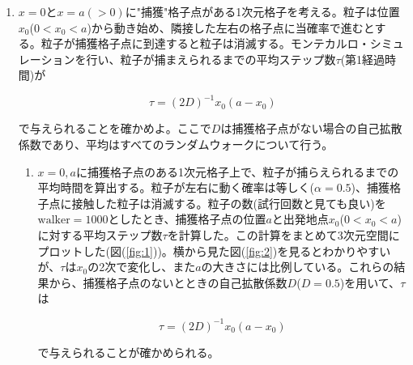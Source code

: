 \documentclass{jsarticle}
\begin{document}
        \begin{enumerate}
            \renewcommand{\labelenumi}{\alph{enumi}.}
            \renewcommand{\labelenumii}{}
            
            \item  $x=0$と$x=a(>0)$に"捕獲"格子点がある1次元格子を考える。粒子は位置$x_{0}$($0<x_{0}<a$)から動き始め、隣接した左右の格子点に当確率で進むとする。粒子が捕獲格子点に到達すると粒子は消滅する。モンテカルロ・シミュレーションを行い、粒子が捕まえられるまでの平均ステップ数$\tau$(第1経過時間)が
            
            \begin{equation}
                \tau = (2D)^{-1}x_{0}(a-x_{0})
            \end{equation}

            で与えられることを確かめよ。ここで$D$は捕獲格子点がない場合の自己拡散係数であり、平均はすべてのランダムウォークについて行う。
            
                \begin{enumerate}
                    \item $x=0,a$に捕獲格子点のある1次元格子上で、粒子が捕らえられるまでの平均時間を算出する。粒子が左右に動く確率は等しく($\alpha=0.5$)、捕獲格子点に接触した粒子は消滅する。粒子の数(試行回数と見ても良い)を$\mathrm{walker}=1000$としたとき、捕獲格子点の位置$a$と出発地点$x_{0}$($0<x_{0}<a$)に対する平均ステップ数$\tau$を計算した。この計算をまとめて3次元空間にプロットした(図(\ref{fig:1}))。横から見た図(\ref{fig:2})を見るとわかりやすいが、$\tau$は$x_{0}$の2次で変化し、また$a$の大きさには比例している。これらの結果から、捕獲格子点のないとときの自己拡散係数$D$($D=0.5$)を用いて、$\tau$は
                    
                    \begin{equation}
                        \tau = (2D)^{-1}x_{0}(a-x_{0})
                    \end{equation}
                    
                    で与えられることが確かめられる。
                    

\end{enumerate}
\end{enumerate}
\end{document}
